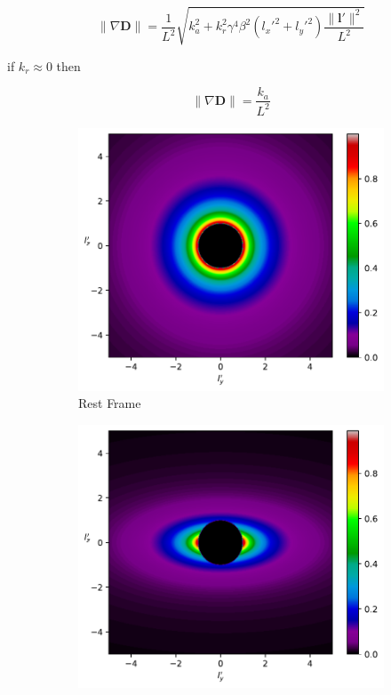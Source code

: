 \begin{equation}
	\| \nabla \mathbf{D} \| = \frac{1}{L^2} \sqrt{ k_{a}^2 + k_r^2 \gamma^4 \beta^2 (l_x'^2+l_y'^2) \frac{\|\mathbf{l'}\|^2}{L^2} }
\end{equation}

if $k_r\approx 0$ then

\begin{equation}
	\| \nabla \mathbf{D} \| = \frac{k_{a}}{L^2}
\end{equation}

\begin{figure}[H]
	\centering
	\begin{subfigure}{0.45\textwidth}
		\centering
		\includegraphics[width=\textwidth]{images/pdf/Density_of_Light_from_Rest_Source.pdf}
		\caption{Rest Frame}
		\label{subfig_1: light emitted from a source's rate of change of vector density}
	\end{subfigure}
	\begin{subfigure}{0.45\textwidth}
		\centering
		\includegraphics[width=\textwidth]{images/pdf/Rate_of_Change_of_Vector_Density_of_Light_from_Moving_Source.pdf}

\end{subfigure}
\end{figure}
